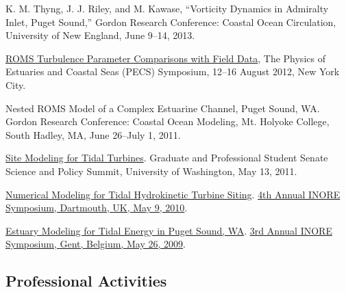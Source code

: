 \documentclass[10pt,letterpaper]{article}
\renewenvironment{itemize}{
  \begin{list}{}{
    \setlength{\leftmargin}{1.5em}
    \setlength{\itemsep}{0.25em}
    \setlength{\parskip}{0pt}
    \setlength{\parsep}{0.25em}
  }
}{
  \end{list}
}
\begin{document}
\begin{itemize}

\item K. M. Thyng, J. J. Riley, and M. Kawase, ``Vorticity Dynamics in Admiralty Inlet, Puget Sound,'' Gordon Research Conference: Coastal Ocean Circulation, University of New England, June 9--14, 2013.

\item \href{http://pong.tamu.edu/~kthyng/posters/pecs.pdf}{ROMS Turbulence Parameter Comparisons with Field Data}, The Physics of Estuaries and Coastal Seas (PECS) Symposium, 12--16 August 2012, New York City.

\item Nested ROMS Model of a Complex Estuarine Channel, Puget Sound, WA. Gordon Research Conference: Coastal Ocean Modeling,
  Mt. Holyoke College, South Hadley,  MA, 
  June 26--July 1, 2011.
  
\item \href{http://froude.me.washington.edu/presentations/GPSS051311.pdf}{Site Modeling for Tidal Turbines}. Graduate and Professional Student Senate Science and Policy Summit, University of Washington, May 13, 2011.

\item \href{http://froude.me.washington.edu/presentations/InorePoster2010/inore.pdf}{Numerical Modeling for Tidal
Hydrokinetic Turbine Siting}. \href{http://www.inore.org}{4th Annual INORE Symposium, Dartmouth, UK, May 9, 2010}.

\item \href{http://froude.me.washington.edu/presentations/inore_poster2009.pdf}{Estuary Modeling for Tidal Energy in Puget Sound, WA}. \href{http://www.inore.org}{3rd Annual INORE Symposium, Gent, Belgium, May 26, 2009}.

\end{itemize}

\subsection*{Professional Activities}
\end{document}
